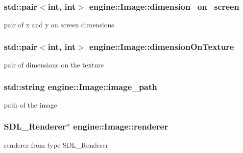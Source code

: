 \subsubsection[{\texorpdfstring{dimension\+\_\+on\+\_\+screen}{dimension_on_screen}}]{\setlength{\rightskip}{0pt plus 5cm}std\+::pair$<$int, int$>$ engine\+::\+Image\+::dimension\+\_\+on\+\_\+screen}\hypertarget{classengine_1_1_image_abbbfdb4ce895511ce54105078fb39ebb}{}\label{classengine_1_1_image_abbbfdb4ce895511ce54105078fb39ebb}
pair of x and y on screen dimensions 
\subsubsection[{\texorpdfstring{dimension\+On\+Texture}{dimensionOnTexture}}]{\setlength{\rightskip}{0pt plus 5cm}std\+::pair$<$int, int$>$ engine\+::\+Image\+::dimension\+On\+Texture}\hypertarget{classengine_1_1_image_aae242af0f586f7c31ffe38657bd0506c}{}\label{classengine_1_1_image_aae242af0f586f7c31ffe38657bd0506c}
pair of dimensions on the texture 
\subsubsection[{\texorpdfstring{image\+\_\+path}{image_path}}]{\setlength{\rightskip}{0pt plus 5cm}std\+::string engine\+::\+Image\+::image\+\_\+path}\hypertarget{classengine_1_1_image_a57960b0ab1636eacff1a5b64d7402b37}{}\label{classengine_1_1_image_a57960b0ab1636eacff1a5b64d7402b37}
path of the image 
\subsubsection[{\texorpdfstring{renderer}{renderer}}]{\setlength{\rightskip}{0pt plus 5cm}S\+D\+L\+\_\+\+Renderer$\ast$ engine\+::\+Image\+::renderer}\hypertarget{classengine_1_1_image_a5ec39840fc23236d16dcdef43b87fc91}{}\label{classengine_1_1_image_a5ec39840fc23236d16dcdef43b87fc91}
renderer from type S\+D\+L\+\_\+\+Renderer 
